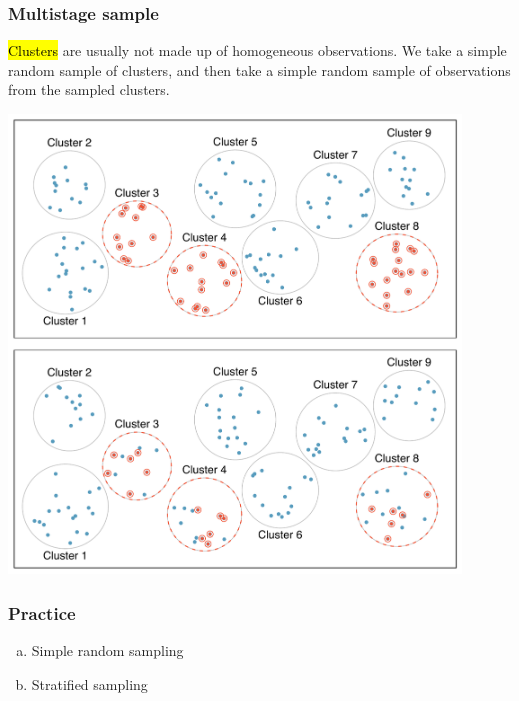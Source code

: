 \begin{frame}
\frametitle{Multistage sample}

\hl{Clusters} are usually not made up of homogeneous observations.  We take a simple random sample of clusters, and then take a simple random sample of observations from the sampled clusters.

\begin{center}
\includegraphics[width=0.9\textwidth]{1-4_obs_studies_sampling/figures/sampling_methods/multistage}
\end{center}

\end{frame}


\begin{frame}
\frametitle{Practice}


\begin{enumerate}[(a)]
\item Simple random sampling
\item Stratified sampling
\end{enumerate}

\end{frame}

